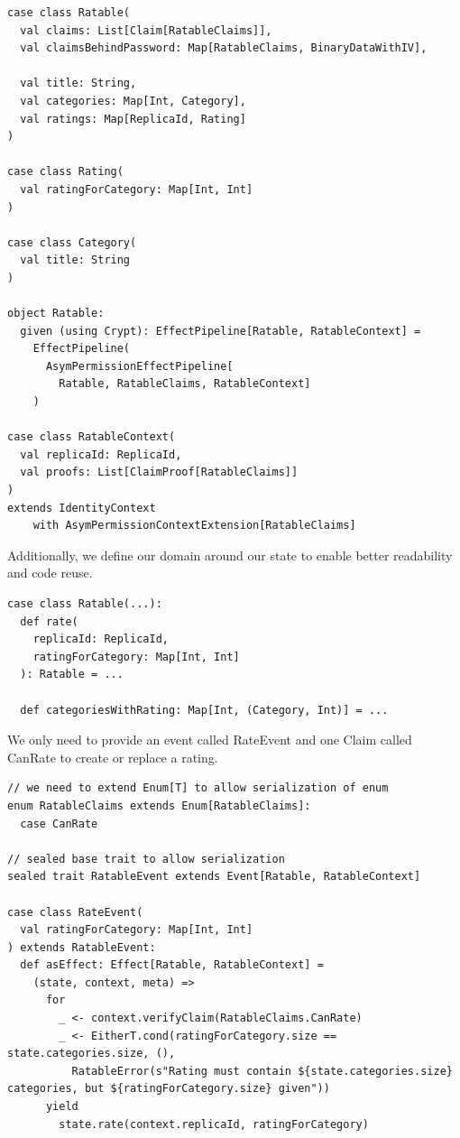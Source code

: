 \documentclass[
	ngerman,
	ruledheaders=section,   %
	class=report,		    %
	thesis={type=bachelor}, %
	accentcolor=9c,			%
	custommargins=true,    %
	marginpar=false,        %
	parskip=half-,          %
	fontsize=11pt,          %
]{tudapub}
\begin{document}
\begin{lstlisting}
case class Ratable(
  val claims: List[Claim[RatableClaims]],
  val claimsBehindPassword: Map[RatableClaims, BinaryDataWithIV],

  val title: String,
  val categories: Map[Int, Category],
  val ratings: Map[ReplicaId, Rating]
)

case class Rating(
  val ratingForCategory: Map[Int, Int]
)

case class Category(
  val title: String
)

object Ratable:
  given (using Crypt): EffectPipeline[Ratable, RatableContext] = 
    EffectPipeline(
      AsymPermissionEffectPipeline[
        Ratable, RatableClaims, RatableContext]
    )

case class RatableContext(
  val replicaId: ReplicaId,
  val proofs: List[ClaimProof[RatableClaims]]
) 
extends IdentityContext 
    with AsymPermissionContextExtension[RatableClaims]
\end{lstlisting}

Additionally, we define our domain around our state to enable better readability and code reuse.

\begin{lstlisting}
case class Ratable(...):
  def rate(
    replicaId: ReplicaId, 
    ratingForCategory: Map[Int, Int]
  ): Ratable = ...

  def categoriesWithRating: Map[Int, (Category, Int)] = ...
\end{lstlisting}

We only need to provide an event called RateEvent and one Claim called CanRate to create or replace a rating.

\begin{lstlisting}
// we need to extend Enum[T] to allow serialization of enum
enum RatableClaims extends Enum[RatableClaims]:
  case CanRate

// sealed base trait to allow serialization
sealed trait RatableEvent extends Event[Ratable, RatableContext]

case class RateEvent(
  val ratingForCategory: Map[Int, Int]
) extends RatableEvent:
  def asEffect: Effect[Ratable, RatableContext] =
    (state, context, meta) =>
      for
        _ <- context.verifyClaim(RatableClaims.CanRate)
        _ <- EitherT.cond(ratingForCategory.size == state.categories.size, (),
          RatableError(s"Rating must contain ${state.categories.size} categories, but ${ratingForCategory.size} given"))
      yield
        state.rate(context.replicaId, ratingForCategory)
\end{lstlisting}
\end{document}

